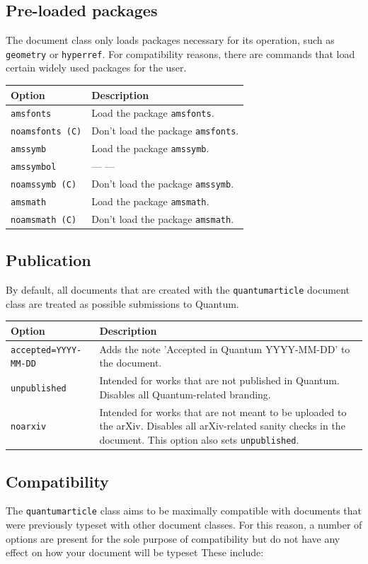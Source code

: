 \documentclass[a4paper,noarxiv,onecolumn]{quantumarticle}
\newcommand*{\ditto}{--- \raisebox{-0.5ex}{''} ---}
\newenvironment{options}
	{\medskip\noindent\begin{longtable}{p{.25\columnwidth}p{.694\columnwidth}}
	\textsf{Option} & \textsf{Description} \\
	\midrule
	}
	{\bottomrule\end{longtable}}
\newcommand{\option}[2]{
	\small\texttt{#1} & {\small#2} \\
}
\newcommand{\compatibilityoption}[2]{
	\small\texttt{#1 (C)} & {\small #2} \\
}
\begin{document}
	\subsection{Pre-loaded packages}
	The document class only loads packages necessary for its operation, such as \texttt{geometry} or \texttt{hyperref}. For compatibility reasons, there are commands that load certain widely used packages for the user.

	\begin{options}
		\option{amsfonts}{%
			Load the package \texttt{amsfonts}.
		}
		\compatibilityoption{noamsfonts}{%
			Don't load the package \texttt{amsfonts}.
		}
		\option{amssymb}{%
			Load the package \texttt{amssymb}.
		}
		\option{amssymbol}{%
			\ditto
		}
		\compatibilityoption{noamssymb}{%
			Don't load the package \texttt{amssymb}.
		}
		\option{amsmath}{%
			Load the package \texttt{amsmath}.
		}
		\compatibilityoption{noamsmath}{%
			Don't load the package \texttt{amsmath}.
		}
	\end{options}

	\subsection{Publication}
	By default, all documents that are created with the \texttt{quantumarticle} document class are treated as possible submissions to Quantum.

	\begin{options}
		\option{accepted=YYYY-MM-DD}{%
			Adds the note 'Accepted in Quantum YYYY-MM-DD' to the document.
		}
		\option{unpublished}{%
			Intended for works that are not published in Quantum. Disables all Quantum-related branding.
		}
		\option{noarxiv}{%
			Intended for works that are not meant to be uploaded to the arXiv. Disables all arXiv-related sanity checks in the document. This option also sets \texttt{unpublished}.
		}
	\end{options}

	\subsection{Compatibility}
	The \texttt{quantumarticle} class aims to be maximally compatible with documents that were previously typeset with other document classes. For this reason, a number of options are present for the sole purpose of compatibility but do not have any effect on how your document will be typeset These include:
\end{document}
